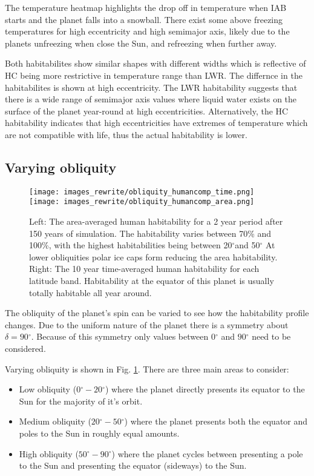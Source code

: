 \documentclass[12pt, onecolumn]{revtex4-2}    %
\newcommand{\degrees}{\ensuremath{^{\circ}}}
\begin{document}
The temperature heatmap highlights the drop off in temperature when IAB starts and the planet falls into a snowball.
There exist some above freezing temperatures for high eccentricity and high semimajor axis, likely due to the planets unfreezing when close the Sun, and refreezing when further away.

Both habitabilites show similar shapes with different widths which is reflective of HC being more restrictive in temperature range than LWR.
The differnce in the habitabilites is shown at high eccentricity.
The LWR habitability suggests that there is a wide range of semimajor axis values where liquid water exists on the surface of the planet year-round at high eccentricities.
Alternatively, the HC habitability indicates that high eccentricities have extremes of temperature which are not compatible with life, thus the actual habitability is lower.

\subsection{Varying obliquity} \label{ssec:qualitative_obliquity}
%
\begin{figure}[t]
  \texttt{[image: images\_rewrite/obliquity\_humancomp\_time.png]}
  \texttt{[image: images\_rewrite/obliquity\_humancomp\_area.png]}
  \caption{
    Left: The area-averaged human habitability for a 2 year period after 150 years of simulation.
    The habitability varies between 70\% and 100\%, with the highest habitabilities being between 20\degrees and 50\degrees
    At lower obliquities polar ice caps form reducing the area habitability.
    Right: The 10 year time-averaged human habitability for each latitude band.
    Habitability at the equator of this planet is usually totally habitable all year around.
  }
  \label{fig:qualitative_obliquity}
\end{figure}

The obliquity of the planet's spin can be varied to see how the habitability profile changes.
Due to the uniform nature of the planet there is a symmetry about $\delta = 90\degrees$.
Because of this symmetry only values between $0\degrees$ and $90\degrees$ need to be considered.

Varying obliquity is shown in Fig. \ref{fig:qualitative_obliquity}.
There are three main areas to consider:
\begin{itemize}
  \item Low obliquity ($0\degrees - 20\degrees$) where the planet directly presents its equator to the Sun for the majority of it's orbit.
  \item Medium obliquity ($20\degrees - 50\degrees$) where the planet presents both the equator and poles to the Sun in roughly equal amounts.
  \item High obliquity ($50\degrees - 90\degrees$) where the planet cycles between presenting a pole to the Sun and presenting the equator (sideways) to the Sun.
\end{itemize}
\end{document}
